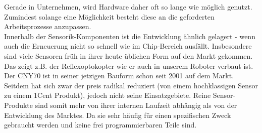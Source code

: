 \documentclass[a4paper,cleardoubleempty,BCOR1cm]{book}
\begin{document}
Gerade in Unternehmen, wird Hardware daher oft so lange wie möglich genutzt. Zumindest solange eine Möglichkeit besteht diese an die geforderten Arbeitsprozesse anzupassen. \\

Innerhalb der Sensorik-Komponenten ist die Entwicklung ähnlich gelagert - wenn auch die Erneuerung nicht so schnell wie im Chip-Bereich ausfällt. Insbesondere sind viele Sensoren früh in ihrer heute üblichen Form auf den Markt gekommen. Das zeigt z.B. der Reflexoptokopter wie er auch in unserem Roboter verbaut ist. Der CNY70 ist in seiner jetzigen Bauform schon seit 2001 auf dem Markt. Seitdem hat sich zwar der preis radikal reduziert (von einem hochklassigen Sensor zu einem 1Cent Produkt), jedoch nicht seine Einsatzgebiete. Reine Sensor-Produkte sind somit mehr von ihrer internen Laufzeit abhängig als von der Entwicklung des Marktes. Da sie sehr häufig für einen spezifischen Zweck gebraucht werden und keine frei programmierbaren Teile sind. 
\end{document}
